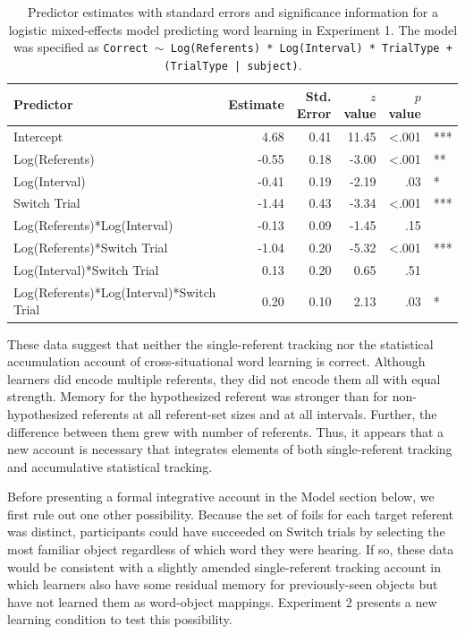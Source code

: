 \documentclass[man,floatsintext]{apa6}
\begin{document}
\begin{table}[t]
\begin{center}
\begin{tabular}{lrrrrl}
 Predictor & Estimate & Std. Error & $z$ value & $p$ value &  \\ 
  \hline
Intercept & 4.68 & 0.41 & 11.45 & <.001 & *** \\ 
  Log(Referents) & -0.55 & 0.18 & -3.00 & <.001 & ** \\ 
  Log(Interval) & -0.41 & 0.19 & -2.19 & .03 & * \\ 
  Switch Trial & -1.44 & 0.43 & -3.34 & <.001 & *** \\ 
  Log(Referents)*Log(Interval) & -0.13 & 0.09 & -1.45 & .15 &  \\ 
  Log(Referents)*Switch Trial & -1.04 & 0.20 & -5.32 & <.001 & *** \\ 
  Log(Interval)*Switch Trial & 0.13 & 0.20 & 0.65 & .51 &  \\ 
  Log(Referents)*Log(Interval)*Switch Trial & 0.20 & 0.10 & 2.13 & .03 & * \\ 
   \hline
\end{tabular}
\end{center}
\vspace{6pt}
\caption{\label{tab:exp1_reg}Predictor estimates with standard errors and significance information for a logistic mixed-effects model predicting word learning in Experiment 1. The model was specified as \small{\tt{Correct $\sim$ Log(Referents) * Log(Interval) * TrialType + (TrialType | subject)}}.}
\end{table}

These data suggest that neither the single-referent tracking nor the statistical accumulation account of cross-situational word learning is correct. Although learners did encode multiple referents, they did not encode them all with equal strength. Memory for the hypothesized referent was stronger than for non-hypothesized referents at all referent-set sizes and at all intervals. Further, the difference between them grew with number of referents. Thus, it appears that a new account is necessary that integrates elements of both single-referent tracking and accumulative statistical tracking.

Before presenting a formal integrative account in the Model section below, we first rule out one other possibility. Because the set of foils for each target referent was distinct, participants could have succeeded on Switch trials by selecting the most familiar object regardless of which word they were hearing. If so, these data would be consistent with a slightly amended single-referent tracking account in which learners also have some residual memory for previously-seen objects but have not learned them as word-object mappings. Experiment 2 presents a new learning condition to test this possibility.
\end{document}
